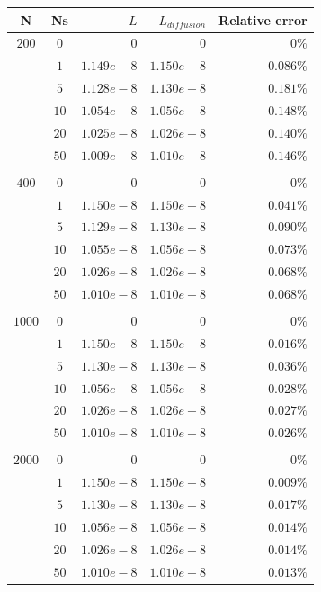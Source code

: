 \documentclass[9pt,twocolumn,twoside,lineno]{gsajnl}
\begin{document}
\begin{table}
    \centering
    \begin{tabular}{ c c r r r }
        N & Ns & $L$ & $L_{diffusion}$ & Relative error \\
        \hline
        $200$  & $0$  & $       0$ & $       0$ & $0\%$ \\
               & $1$  & $1.149e-8$ & $1.150e-8$ & $0.086\%$ \\
               & $5$  & $1.128e-8$ & $1.130e-8$ & $0.181\%$ \\
               & $10$ & $1.054e-8$ & $1.056e-8$ & $0.148\%$ \\
               & $20$ & $1.025e-8$ & $1.026e-8$ & $0.140\%$ \\
               & $50$ & $1.009e-8$ & $1.010e-8$ & $0.146\%$ \\
        \\
        $400$  & $0$  & $       0$ & $       0$ & $0\%$ \\
               & $1$  & $1.150e-8$ & $1.150e-8$ & $0.041\%$ \\
               & $5$  & $1.129e-8$ & $1.130e-8$ & $0.090\%$ \\
               & $10$ & $1.055e-8$ & $1.056e-8$ & $0.073\%$ \\
               & $20$ & $1.026e-8$ & $1.026e-8$ & $0.068\%$ \\
               & $50$ & $1.010e-8$ & $1.010e-8$ & $0.068\%$ \\
        \\
        $1000$ & $0$  & $       0$ & $       0$ & $0\%$ \\
               & $1$  & $1.150e-8$ & $1.150e-8$ & $0.016\%$ \\
               & $5$  & $1.130e-8$ & $1.130e-8$ & $0.036\%$ \\
               & $10$ & $1.056e-8$ & $1.056e-8$ & $0.028\%$ \\
               & $20$ & $1.026e-8$ & $1.026e-8$ & $0.027\%$ \\
               & $50$ & $1.010e-8$ & $1.010e-8$ & $0.026\%$ \\
        \\
        $2000$ & $0$  & $       0$ & $       0$ & $0\%$ \\
               & $1$  & $1.150e-8$ & $1.150e-8$ & $0.009\%$ \\
               & $5$  & $1.130e-8$ & $1.130e-8$ & $0.017\%$ \\
               & $10$ & $1.056e-8$ & $1.056e-8$ & $0.014\%$ \\
               & $20$ & $1.026e-8$ & $1.026e-8$ & $0.014\%$ \\
               & $50$ & $1.010e-8$ & $1.010e-8$ & $0.013\%$ \\
        \end{tabular}


\end{table}
\end{document}
